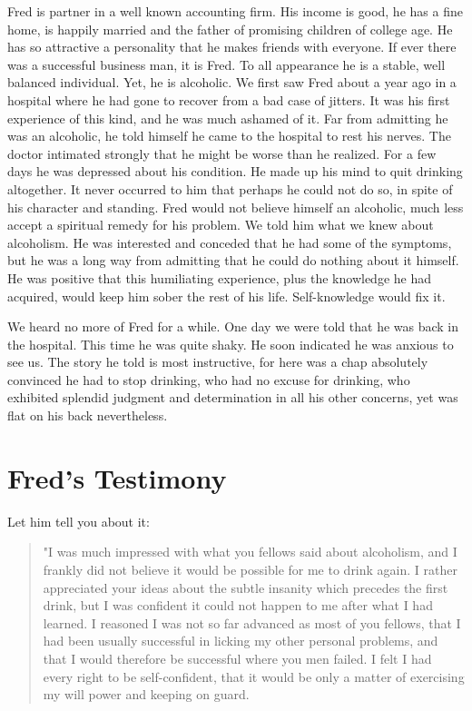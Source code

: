 Fred is partner in a well known accounting firm. 
His income is good, he has a fine home, 
is happily married and the father of promising children of college age. 
He has so attractive a personality that he makes friends with everyone. 
If ever there was a successful business man, it is Fred. 
To all appearance he is a stable, well balanced individual. 
Yet, he is alcoholic. 
We first saw Fred about a year ago in a hospital where he had gone to recover from a bad case of jitters. 
It was his first experience of this kind, and he was much ashamed of it. 
Far from admitting he was an alcoholic, he told himself he came to the hospital to rest his nerves. 
The doctor intimated strongly that he might be worse than he realized. 
For a few days he was depressed about his condition. 
He made up his mind to quit drinking altogether. 
It never occurred to him that perhaps he could not do so, in spite of his character and standing. 
Fred would not believe himself an alcoholic, much less accept a spiritual remedy for his problem. 
We told him what we knew about alcoholism. 
He was interested and conceded that he had some of the symptoms, 
but he was a long way from admitting that he could do nothing about it himself. 
He was positive that this humiliating experience, 
plus the knowledge he had acquired, 
would keep him sober the rest of his life. 
Self-knowledge would fix it.

We heard no more of Fred for a while. 
One day we were told that he was back in the hospital. 
This time he was quite shaky. 
He soon indicated he was anxious to see us. 
The story he told is most instructive, 
for here was a chap absolutely convinced he had to stop drinking, 
who had no excuse for drinking, 
who exhibited splendid judgment and determination in all his other concerns, 
yet was flat on his back nevertheless.


\section{Fred's Testimony}

Let him tell you about it: 

\begin{quote}
"I was much impressed with what you fellows said about alcoholism, 
and I frankly did not believe it would be possible for me to drink again. 
I rather appreciated your ideas about the subtle insanity which precedes the first drink, 
but I was confident it could not happen to me after what I had learned. 
I reasoned I was not so far advanced as most of you fellows, 
that I had been usually successful in licking my other personal problems, 
and that I would therefore be successful where you men failed. 
I felt I had every right to be self-confident, 
that it would be only a matter of exercising my will power and keeping on guard.
\end{quote}

